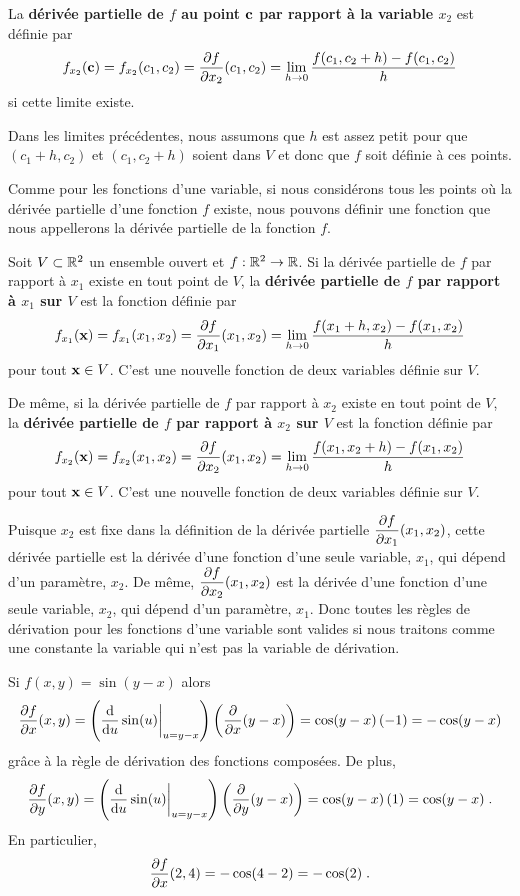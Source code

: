 {\begin{defn}
La {\bfseries dérivée partielle de $f$ au point $\VEC{c}$ par rapport à la
variable $x_2$} est définie par
\[
f_{x_2}(\VEC{c}) = f_{x_2}(c_1,c_2) 
= \pdydx{f}{x_2}(c_1,c_2)
= \lim_{h\rightarrow 0}\frac{f(c_1,c_2+h)-f(c_1,c_2)}{h}
\]
si cette limite existe.

Dans les limites précédentes, nous assumons que $h$ est assez petit pour que
$(c_1+h,c_2)$ et $(c_1,c_2+h)$ soient dans $V$ et donc que $f$ soit définie à
ces points.
\end{defn}

Comme pour les fonctions d'une variable, si nous considérons tous les points où
la dérivée partielle d'une fonction $f$ existe, nous pouvons définir
une fonction que nous appellerons la dérivée partielle de la fonction $f$.

\begin{defn} 
Soit $V\subset \RR^2$ un ensemble ouvert et $f:\RR^2 \rightarrow \RR$.  Si
la dérivée partielle de $f$ par rapport à $x_1$ existe en tout point de $V$,
la {\bfseries dérivée partielle de $f$ par rapport à $x_1$ sur $V$} est la
fonction définie par
\[
f_{x_1}(\VEC{x}) = f_{x_1}(x_1,x_2) 
= \pdydx{f}{x_1}(x_1,x_2)
= \lim_{h\rightarrow 0}\frac{f(x_1+h,x_2)-f(x_1,x_2)}{h}
\]
pour tout $\VEC{x}\in V$.  C'est une nouvelle fonction de deux variables
définie sur $V$.

De même, si la dérivée partielle de $f$ par rapport à $x_2$ existe en tout
point de $V$, la {\bfseries dérivée partielle de $f$ par rapport à $x_2$ sur
$V$} est la fonction définie par
\[
f_{x_2}(\VEC{x}) = f_{x_2}(x_1,x_2) 
= \pdydx{f}{x_2}(x_1,x_2)
= \lim_{h\rightarrow 0}\frac{f(x_1,x_2+h)-f(x_1,x_2)}{h}
\]
pour tout $\VEC{x}\in V$.  C'est une nouvelle fonction de deux variables
définie sur $V$.
\end{defn}

Puisque $x_2$ est fixe dans la définition de la dérivée partielle
$\displaystyle \pdydx{f}{x_1}(x_1,x_2)$, cette dérivée partielle est la
dérivée d'une fonction d'une seule variable, $x_1$, qui dépend d'un
paramètre, $x_2$.  De même, $\displaystyle \pdydx{f}{x_2}(x_1,x_2)$ est
la dérivée d'une fonction d'une seule variable, $x_2$, qui dépend d'un
paramètre, $x_1$.  Donc toutes les règles de dérivation pour les
fonctions d'une variable sont valides si nous traitons comme une constante
la variable qui n'est pas la variable de dérivation.

\begin{egg}
Si $f(x,y) = \sin(y-x)$ alors
\[
\pdydx{f}{x}(x,y) =
\left(\dfdx{\sin(u)}{u}\bigg|_{u=y-x}\right)
\left(\pdfdx{(y-x)}{x} \right)
= \cos(y-x)\,(-1) = -\cos(y-x)
\]
grâce à la règle de dérivation des fonctions composées. De plus,
\[
\pdydx{f}{y}(x,y) =
\left(\dfdx{\sin(u)}{u}\bigg|_{u=y-x}\right)
\left(\pdfdx{(y-x)}{y} \right)
= \cos(y-x)\,(1) = \cos(y-x) \; .
\]
En particulier,
\[
\pdydx{f}{x}(2,4) = -\cos(4-2) = -\cos(2) \; .
\]
\end{egg}

}
